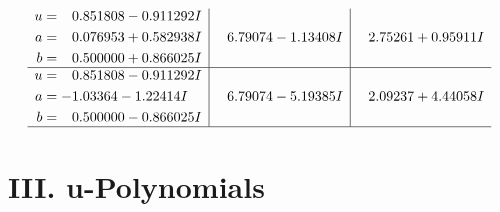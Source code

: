 \documentclass[1p]{elsarticle_modified}
\theoremstyle{definition}
\begin{document}
$$\begin{array}{c|c|c}
\begin{aligned}
u &= \phantom{-}0.851808 - 0.911292 I \\
a &= \phantom{-}0.076953 + 0.582938 I \\
b &= \phantom{-}0.500000 + 0.866025 I\end{aligned}
 & \phantom{-}6.79074 - 1.13408 I & \phantom{-}2.75261 + 0.95911 I \\ \hline\begin{aligned}
u &= \phantom{-}0.851808 - 0.911292 I \\
a &= -1.03364 - 1.22414 I \\
b &= \phantom{-}0.500000 - 0.866025 I\end{aligned}
 & \phantom{-}6.79074 - 5.19385 I & \phantom{-}2.09237 + 4.44058 I\\
 \hline 
 \end{array}$$\newpage
\newpage\renewcommand{\arraystretch}{1}
\centering \section*{ III. u-Polynomials}
\end{document}
